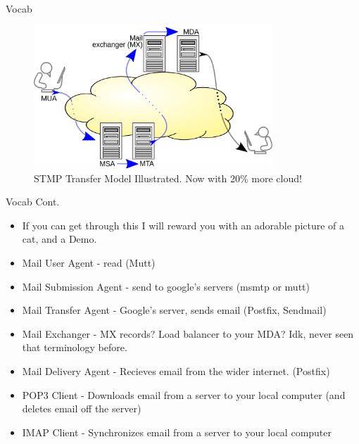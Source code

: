\begin{frame}[t]{Vocab}
\begin{figure}
    \centering
    \includegraphics[width = 0.8\textwidth]{./SMTP-transfer-model.png}
    \caption[font=small]{STMP Transfer Model Illustrated. Now with 20\% more cloud!}
  \end{figure}
\end{frame}

\begin{frame}[t]{Vocab Cont.}
\begin{itemize}
    \item If you can get through this I will reward you with an adorable picture of a cat, and a Demo.
    \item Mail User Agent - read (Mutt)
    \item Mail Submission Agent - send to google's servers (msmtp or mutt)
    \item Mail Transfer Agent - Google's server, sends email (Postfix, Sendmail)
    \item Mail Exchanger - MX records? Load balancer to your MDA? Idk, never seen that terminology before.
    \item Mail Delivery Agent - Recieves email from the wider internet. (Postfix)
    \item POP3 Client - Downloads email from a server to your local computer (and deletes email off the server)
    \item IMAP Client - Synchronizes email from a server to your local computer
\end{itemize}
\end{frame}

